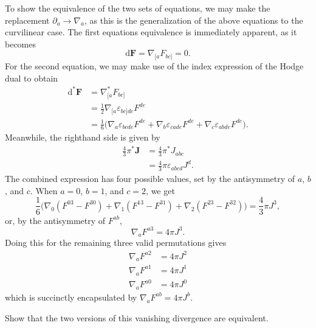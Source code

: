 \documentclass[../road-to-reality.tex]{subfiles}
\begin{document}
\begin{questions}
  \begin{solution}
    To show the equivalence of the two sets of equations, we may make the
    replacement $\partial_a\to\nabla_a$, as this is the generalization of the
    above equations to the curvilinear case. The first equations equivalence is
    immediately apparent, as it becomes
    \[
      \mathrm{d}\mathbf{F} = \nabla_{[a}F_{bc]} = 0.
    \]
    For the second equation, we may make use of the index expression of the
    Hodge dual to obtain
    \begin{align*}
      \mathrm{d}^*\mathbf{F} &= \nabla_{[a}^*F_{bc]} \\
                             &= \frac{1}{2}\nabla_{[a}\varepsilon_{bc]de}F^{de} \\
                             &= \frac{1}{6}\Big(\nabla_a\varepsilon_{bcde}F^{de} + \nabla_{b}\varepsilon_{cade}F^{de} + \nabla_{c}\varepsilon_{abde}F^{de}\Big).
    \end{align*}
    Meanwhile, the righthand side is given by
    \begin{align*}
      \frac{4}{3}\pi^*\mathbf{J} &= \frac{4}{3}\pi^*J_{abc} \\
                                 &= \frac{4}{3}\pi\varepsilon_{abcd}J^d.
    \end{align*}
    The combined expression has four possible values, set by the antisymmetry of $a$, $b$, and
    $c$. When $a=0$, $b=1$, and $c=2$, we get
    \[
      \frac{1}{6}\Big(\nabla_0(F^{03} - F^{30}) + \nabla_1(F^{13} - F^{31}) + \nabla_2(F^{23} -
      F^{32})\Big) = \frac{4}{3}\pi{J^3},
    \]
    or, by the antisymmetry of $F^{ab}$,
    \[
      \nabla_{a}F^{a3} = 4\pi{J^3}.
    \]
    Doing this for the remaining three valid permutations gives
    \begin{align*}
      \nabla_aF^{a2} &= 4\pi{J^2} \\
      \nabla_aF^{a1} &= 4\pi{J^1} \\
      \nabla_aF^{a0} &= 4\pi{J^0}
    \end{align*}
    which is succinctly encapsulated by $\nabla_aF^{ab}=4\pi{J^b}$.
  \end{solution}

\question Show that the two versions of this vanishing divergence are equivalent.


\end{questions}
\end{document}

